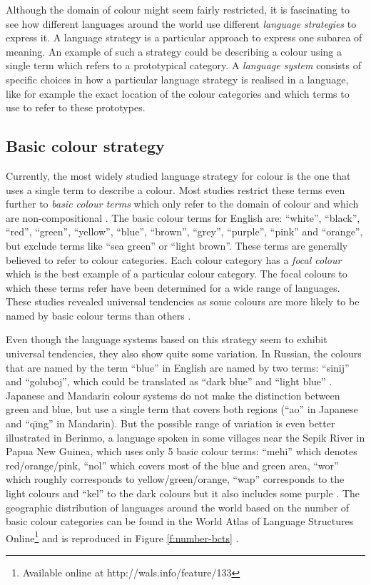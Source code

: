 Although the domain of colour might seem fairly restricted, it is
fascinating to see how different languages around the world use
different \emph{language strategies} to
express it. A language strategy is a particular approach to express
one subarea of meaning. An example of such a strategy could be
describing a colour using a single term which refers to a prototypical
category. A \emph{language system} consists of
specific choices in how a particular language strategy is realised in
a language, like for example the exact location of the colour
categories and which terms to use to refer to these prototypes.

\subsection{Basic colour strategy}
\label{s:intro-basic-colour-strategy}

Currently, the most widely studied language strategy for colour is the
one that uses a single term to describe a colour. Most studies
restrict these terms even further to \emph{basic colour
  terms} which only refer to the domain of
colour and which are non-compositional \citep{berlin69basic}. The
basic colour terms for English are: ``white'', ``black'', ``red'',
``green'', ``yellow'', ``blue'', ``brown'', ``grey'', ``purple'',
``pink'' and ``orange'', but exclude terms like ``sea green'' or
``light brown''. These terms are generally believed to refer to colour
categories. Each colour category has a \emph{focal colour} which is the best example of a particular colour
category. The focal colours to which these terms refer have been
determined for a wide range of languages. These studies revealed
universal tendencies as some colours are more likely to be named by
basic colour terms than others \citep{regier05focal}.

Even though the language systems based on this strategy seem to
exhibit universal tendencies, they also show quite some
variation. In Russian, the colours that are named by the term ``blue''
in English are named by two terms: ``sinij'' and ``goluboj'', which
could be translated as ``dark blue'' and ``light blue''
\citep{safuanova07russian}. Japanese and Mandarin colour systems do
not make the distinction between green and blue, but use a single term
that covers both regions (``ao'' in Japanese and ``q\= \i ng'' in
Mandarin). But the possible range of variation is even better
illustrated in Berinmo, a language spoken in some villages near the
Sepik River in Papua New Guinea, which uses only 5 basic colour terms:
``mehi'' which denotes red/orange/pink, ``nol'' which covers most of
the blue and green area, ``wor'' which roughly corresponds to
yellow/green/orange, ``wap'' corresponds to the light colours and
``kel'' to the dark colours but it also includes some purple
\citep{roberson02color}. The geographic distribution of languages
around the world based on the number of basic colour categories can be
found in the World Atlas of Language Structures
Online\footnote{Available online at http://wals.info/feature/133} and
is reproduced in Figure \ref{f:number-bcts} \citep{kay08number}.

